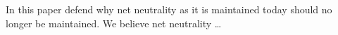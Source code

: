 
In this paper  defend why net neutrality as it is maintained today should no longer be maintained. We believe net neutrality \ldots %